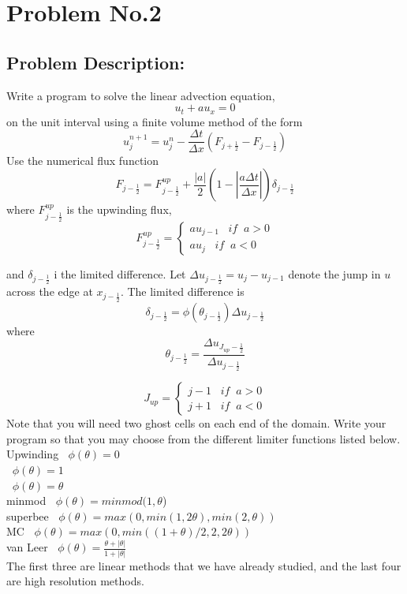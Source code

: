 \section{Problem No.2} \label{sec:prob2}
\subsection{Problem Description:} 
Write a program to solve the linear advection equation,
$$
u_{t}+au_{x}=0
$$
on the unit interval using a finite volume method of the form
$$
u_{j}^{n+1} = u_{j}^{n} - \frac{\Delta t}{\Delta x}(F_{j+\frac{1}{2}} -F_{j-\frac{1}{2}})
$$
Use the numerical flux function 
$$
F_{j-\frac{1}{2}} = F_{j-\frac{1}{2}}^{up} + \frac{|a|}{2}(1-|\frac{a\Delta t}{\Delta x}|)\delta_{j-\frac{1}{2}}
$$
where $F_{j-\frac{1}{2}}^{up}$ is the upwinding flux,
$$
F_{j-\frac{1}{2}}^{up}=\begin{cases}
         			au_{j-1}\;\;\; if \;\; a> 0\\
         			au_{j}\;\;\; if \;\; a< 0
         			\end{cases}
$$

and $\delta_{j-\frac{1}{2}}$ i the limited difference. Let $\Delta u_{j-\frac{1}{2}} = u_{j}-u_{j-1}$ denote the jump in $u$ across the edge at $x_{j-\frac{1}{2}}$. The limited difference is 
$$
\delta_{j-\frac{1}{2}} = \phi(\theta_{j-\frac{1}{2}})\Delta u_{j-\frac{1}{2}}
$$
where 
$$
\theta_{j-\frac{1}{2}} = \frac{\Delta u_{J_{up}-\frac{1}{2}}}{\Delta u_{j-\frac{1}{2}}}
$$

$$
J_{up} = \begin{cases}
         j-1\;\;\; if \;\; a> 0\\
         j+1\;\;\; if \;\; a< 0
         \end{cases}
$$
Note that you will need two ghost cells on each end of the domain. Write your program so that you may choose from the different limiter functions listed below. 
\\
Upwinding  $\;\; \phi(\theta)=0$\\
\protect{\lw} $\;\; \phi(\theta)=1$\\
\protect{\bw} $\;\; \phi(\theta)=\theta$\\
minmod $\;\; \phi(\theta)=minmod(1,\theta$)\\
superbee $\;\; \phi(\theta)=max(0,min(1,2\theta),min(2,\theta))$\\
MC $\;\; \phi(\theta)=max(0,min((1+\theta)/2,2,2\theta))$\\
van Leer $\;\; \phi(\theta)=\frac{\theta+|\theta|}{1+|\theta|}$\\
The first three are linear methods that we have already studied, and the last four are high resolution methods. 

